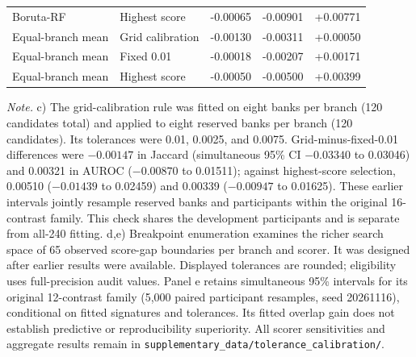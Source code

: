 \begin{table}[p]
\begin{tabular}{llrrr}
Boruta-RF & Highest score & -0.00065 & -0.00901 & +0.00771 \\
Equal-branch mean & Grid calibration & -0.00130 & -0.00311 & +0.00050 \\
Equal-branch mean & Fixed 0.01 & -0.00018 & -0.00207 & +0.00171 \\
Equal-branch mean & Highest score & -0.00050 & -0.00500 & +0.00399 \\
\bottomrule
\end{tabular}
\par\medskip
\parbox{0.98\linewidth}{\footnotesize
\textit{Note.} c) The grid-calibration rule was fitted on eight banks per branch (120 candidates total) and applied to eight reserved banks per branch (120 candidates). Its tolerances were 0.01, 0.0025, and 0.0075. Grid-minus-fixed-0.01 differences were $-0.00147$ in Jaccard (simultaneous 95\% CI $-0.03340$ to 0.03046) and 0.00321 in AUROC ($-0.00870$ to 0.01511); against highest-score selection, 0.00510 ($-0.01439$ to 0.02459) and 0.00339 ($-0.00947$ to 0.01625). These earlier intervals jointly resample reserved banks and participants within the original 16-contrast family. This check shares the development participants and is separate from all-240 fitting. d,e) Breakpoint enumeration examines the richer search space of 65 observed score-gap boundaries per branch and scorer. It was designed after earlier results were available. Displayed tolerances are rounded; eligibility uses full-precision audit values. Panel e retains simultaneous 95\% intervals for its original 12-contrast family (5,000 paired participant resamples, seed 20261116), conditional on fitted signatures and tolerances. Its fitted overlap gain does not establish predictive or reproducibility superiority. All scorer sensitivities and aggregate results remain in \texttt{supplementary\_data/tolerance\_calibration/}.}
\end{table}
